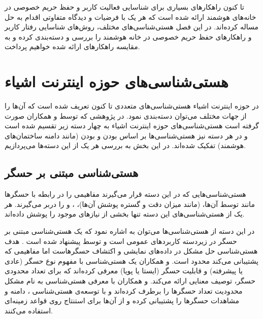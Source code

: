 \label{chapter:c3}

تا کنون راهکارهای بسیاری برای شناسایی فعالیت کاربر و حفظ حریم خصوصی در خانه‌های هوشمند ارائه شده است که هر یک با فرضیات و دیدگاه متفاوتی اقدام به حل مساله کرده‌اند. در این فصل هستی‌شناسی‌های مختلف، روش‌های شناسایی رفتار کاربر و راهکارهای حفظ حریم خصوصی در خانه هوشمند را بررسی و دسته‌بندی کرده و به مقایسه راهکارهای ارائه شده خواهیم پرداخت.

\section{هستی‌شناسی‌های حوزه اینترنت اشیاء}\label{chapter:c31}

در حوزه اینترنت اشیاء هستی‌‌شناسی‌‌های متعددی تا کنون تعریف شده است که آن‌ها را از جهات مختلف می‌‌توان دسته‌‌بندی نمود. در پژوهشی که توسط  و همکاران \cite{x232} صورت گرفته است هستی‌شناسی‌‌های حوزه اینترنت اشیاء به چهار دسته زیر تقسیم شده است و در هر دسته نیز هستی‌‌شناسی‌‌ها بر اساس  بودن و  بودن (مانند دامنه ساختمان‌های هوشمند) تفکیک شده‌‌اند. در این بخش به بررسی هر یک از این دسته‌ها می‌پردازیم. 

\subsection{هستی‌شناسی مبتنی بر حسگر}

هستی‌‌شناسی‌‌هایی که در این دسته قرار می‌‌گیرند مفاهیمی را در رابطه با حسگرها مانند  توسط آن‌ها،  (مانند میزان دقت و گستره پوشش آن‌ها)، ،  و  را دربر می‌‌گیرند. هر يک از هستی‌‌شناسی‌‌های این دسته تنها بخشی از نيازهای موجود را پوشش داده‌‌اند.

در این دسته از هستی‌‌شناسی‌‌ها می‌‌توان به  اشاره نمود که یک هستی‌‌شناسی مبتنی بر حسگر در زیردسته کاربردهای عمومی است و توسط پیشنهاد شده است \cite{x232Z10}. هدف هستی‌شناسی  حل مشکل  در داده‌های نمایشی و اکتشاف حسگرهاست اما مفاهیمی که پشتیبانی می‌کند محدود است.  و همکاران \cite{x232Z11} یک هستی‌شناسی با مفهوم نوع حسگر (عادی یا پیشرفته) و قابلیت حسگر (ایستا یا پویا) معرفی کرده‌اند که برای تعداد محدودی حسگر، توصیف معنایی ارائه می‌کند.  و همکاران \cite{x232Z12} با معرفی هستی‌شناسی به نام  مشکل محدودیت تعداد حسگرها را برطرف کرده‌اند و با توسعه‌ی هستی‌شناسی ، دامنه و مشاهدات حسگرها را پشتیبانی کرده و از آن‌ها برای استنتاج روی قواعد زمینه‌ای استفاده می‌کنند.

